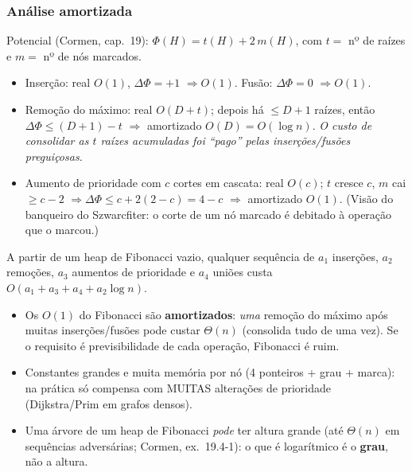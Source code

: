 \subsubsection{Análise amortizada}
Potencial (Cormen, cap.~19): $\Phi(H)=t(H)+2\,m(H)$, com $t=$ nº de raízes e $m=$ nº de nós marcados.
\begin{itemize}
  \item Inserção: real $O(1)$, $\Delta\Phi=+1$ $\Rightarrow O(1)$. Fusão: $\Delta\Phi=0$ $\Rightarrow O(1)$.
  \item Remoção do máximo: real $O(D+t)$; depois há $\le D+1$ raízes, então $\Delta\Phi\le (D+1)-t$ $\Rightarrow$ amortizado $O(D)=O(\log n)$. \emph{O custo de consolidar as $t$ raízes acumuladas foi ``pago'' pelas inserções/fusões preguiçosas.}
  \item Aumento de prioridade com $c$ cortes em cascata: real $O(c)$; $t$ cresce $c$, $m$ cai $\ge c-2$ $\Rightarrow\Delta\Phi\le c+2(2-c)=4-c$ $\Rightarrow$ amortizado $O(1)$. (Visão do banqueiro do Szwarcfiter: o corte de um nó marcado é debitado à operação que o marcou.)
\end{itemize}
\begin{teo}[Aula de 21/08]
A partir de um heap de Fibonacci vazio, qualquer sequência de $a_1$ inserções, $a_2$ remoções, $a_3$ aumentos de prioridade e $a_4$ uniões custa $O(a_1+a_3+a_4+a_2\log n)$.
\end{teo}

\begin{cuidado}
\begin{itemize}
  \item Os $O(1)$ do Fibonacci são \textbf{amortizados}: \emph{uma} remoção do máximo após muitas inserções/fusões pode custar $\Theta(n)$ (consolida tudo de uma vez). Se o requisito é previsibilidade de cada operação, Fibonacci é ruim.
  \item Constantes grandes e muita memória por nó (4 ponteiros + grau + marca): na prática só compensa com MUITAS alterações de prioridade (Dijkstra/Prim em grafos densos).
  \item Uma árvore de um heap de Fibonacci \emph{pode} ter altura grande (até $\Theta(n)$ em sequências adversárias; Cormen, ex.~19.4-1): o que é logarítmico é o \textbf{grau}, não a altura.
\end{itemize}
\end{cuidado}

